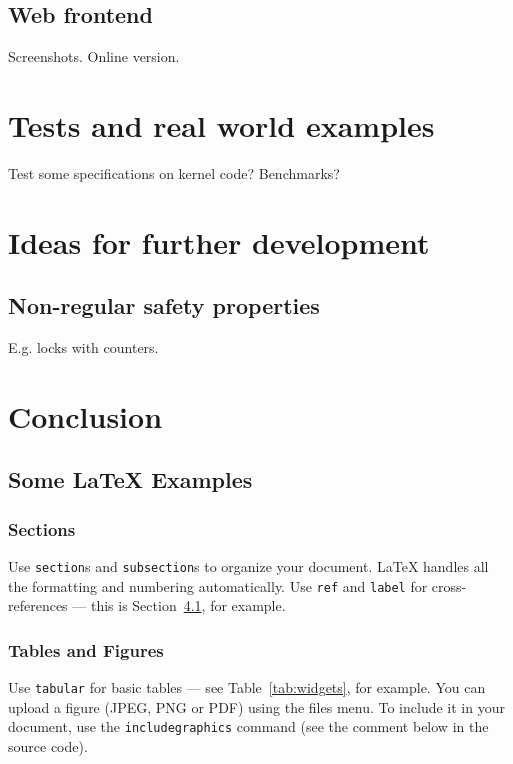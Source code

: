 \documentclass[
fontsize=11pt,paper=a4,
bibliography=totoc, listof=totoc,
headsepline,footsepline,
footinclude=false,BCOR=12mm,DIV=13]{scrbook}
\begin{document}
\section{Web frontend}
Screenshots.
Online version.


\chapter{Tests and real world examples}
Test some specifications on kernel code?
Benchmarks?


\chapter{Ideas for further development}
\section{Non-regular safety properties}
E.g. locks with counters.


\chapter{Conclusion}




\section{Some \LaTeX{} Examples}
\label{sec:examples}

\subsection{Sections}

Use \texttt{section}s and \texttt{subsection}s to organize your document. \LaTeX{} handles all the formatting and numbering automatically. Use \texttt{ref} and \texttt{label} for cross-references --- this is Section~\ref{sec:examples}, for example.

\subsection{Tables and Figures}

Use \texttt{tabular} for basic tables --- see Table~\ref{tab:widgets}, for example. You can upload a figure (JPEG, PNG or PDF) using the files menu. To include it in your document, use the \texttt{includegraphics} command (see the comment below in the source code).

\end{document}
